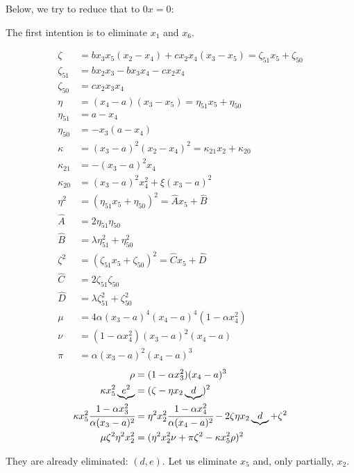 \documentclass[12pt]{article}
\numberwithin{table}{section}
\begin{document}
Below, we try to reduce that to $0x = 0$:

The first intention is to eliminate $x_1$ and $x_6$.

\begin{align}
\zeta &= b x_3 x_5 (x_2 - x_4) + cx_2 x_4(x_3 - x_5) = \zeta_{51} x_5 + \zeta_{50} \\
\zeta_{51} &= bx_2x_3 - b x_3x_4 - cx_2 x_4 \\
\zeta_{50} &= cx_2 x_3 x_4 \\
\eta &= (x_4-a) (x_3 - x_5) = \eta_{51} x_5 + \eta_{50} \\
\eta_{51} &= a - x_4 \\
\eta_{50} &= -x_3 (a - x_4)\\
\kappa &= (x_3-a)^2 (x_2 - x_4)^2 =\kappa_{21} x_2 + \kappa_{20} \\
\kappa_{21} &= - (x_3-a)^2 x_4\\
\kappa_{20} &= (x_3-a)^2 x_4^2 + \xi (x_3-a)^2\\
\eta^2 &= (\eta_{51} x_5 + \eta_{50})^2 = \hat A x_5 + \hat B \\
\hat A &= 2\eta_{51}\eta_{50} \\
\hat B &= \lambda \eta_{51}^2 + \eta_{50}^2\\
\zeta^2 &= (\zeta_{51} x_5 + \zeta_{50})^2  = \hat C x_5 + \hat D\\
\hat C &= 2\zeta_{51}\zeta_{50} \\
\hat D &= \lambda \zeta_{51}^2 + \zeta_{50}^2 \\
\mu &= 4\alpha (x_3 - a)^4 (x_4 - a)^4(1 - \alpha x_4^2 ) \\
\nu &= (1 - \alpha x_4^2)(x_3-a)^2(x_4-a)\\
\pi &= \alpha (x_3-a)^2(x_4-a)^3
\end{align}
\begin{align}
\rho &= (1 - \alpha x_3^2 )(x_4-a)^3\\
\kappa x_5^2 \underbrace{e^2} &= (\zeta - \eta x_2 \underbrace{d})^2 \\ 
\kappa x_5^2 \cfrac{1 - \alpha x_3^2 }{\alpha (x_3-a)^2} &= \eta^2 x_2^2 \cfrac{1 - \alpha x_4^2 }{\alpha (x_4-a)^2} - 2 \zeta \eta x_2 \underbrace{d} + \zeta^2 \\
 \mu \zeta^2 \eta^2 x_2^2  &= (\eta^2 x_2^2 \nu  + \pi \zeta^2 - \kappa x_5^2 \rho)^2 
\end{align}

They are already eliminated: $(d,e)$. Let us eliminate $x_5$ and, only partially, $x_2$.
\end{document}
